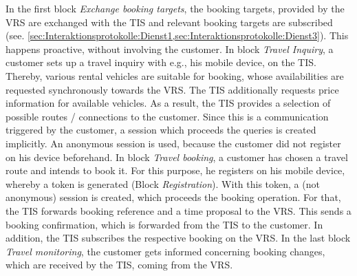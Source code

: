 In the first block \textit{Exchange booking targets}, the booking targets, provided by the VRS are exchanged with the TIS and relevant booking targets are subscribed (see. \cref{sec:Interaktionsprotokolle:Dienst1,sec:Interaktionsprotokolle:Dienst3}). This happens proactive, without involving the customer.
In block \textit{Travel Inquiry}, a customer sets up a travel inquiry with e.g., his mobile device, on the TIS. Thereby, various rental vehicles are suitable for booking, whose availabilities are requested synchronously towards the VRS. The TIS additionally requests price information for available vehicles. As a result, the TIS provides a selection of possible routes / connections to the customer. Since this is a communication triggered by the customer, a session which proceeds the queries is created implicitly. An anonymous session is used, because the customer did not register on his device beforehand.
In block \textit{Travel booking}, a customer has chosen a travel route and intends to book it. For this purpose, he registers on his mobile device, whereby a token is generated (Block \emph{Registration}). With this token, a (not anonymous) session is created, which proceeds the booking operation. For that, the TIS forwards booking reference and a time proposal to the VRS. This sends a booking confirmation, which is forwarded from the TIS to the customer. In addition, the TIS subscribes the respective booking on the VRS.
In the last block \textit{Travel monitoring}, the customer gets informed concerning booking changes, which are received by the TIS, coming from the VRS.
